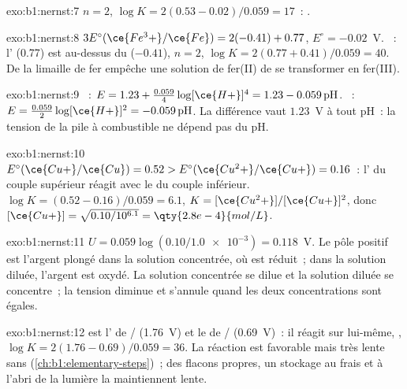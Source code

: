 \begin{solution}{exo:b1:nernst:7}
$n = 2$, $\log K = 2(0.53 - 0.02)/0.059 = 17$~: .
\end{solution}

\begin{solution}{exo:b1:nernst:8}
$3E^\circ(\ce{Fe^3+}/\ce{Fe}) = 2(-0.41) + 0.77$, $E^\circ = -0.02$~V.
~: l'  (0.77) est au-dessus du
  ($-0.41$), $n = 2$,
$\log K = 2(0.77 + 0.41)/0.059 = 40$. De la limaille de fer empêche une
solution de fer(II) de se transformer en fer(III).
\end{solution}

\begin{solution}{exo:b1:nernst:9}
~: $E = 1.23 + \frac{0.059}{4}\log [\ce{H+}]^4 =
1.23 - 0.059\,\mathrm{pH}$. ~: $E = \frac{0.059}{2}\log
[\ce{H+}]^2 = -0.059\,\mathrm{pH}$. La différence vaut $1.23$~V à tout
pH~: la tension de la pile à combustible ne dépend pas du pH.
\end{solution}

\begin{solution}{exo:b1:nernst:10}
$E^\circ(\ce{Cu+}/\ce{Cu}) = 0.52 > E^\circ(\ce{Cu^2+}/\ce{Cu+}) = 0.16$~:
l'  du couple supérieur réagit avec le  
du couple inférieur. $\log K = (0.52 - 0.16)/0.059 = 6.1$, $K =
[\ce{Cu^2+}]/[\ce{Cu+}]^2$, donc $[\ce{Cu+}] = \sqrt{0.10/10^{6.1}} =
\qty{2.8e-4}{mol/L}$.
\end{solution}

\begin{solution}{exo:b1:nernst:11}
$U = 0.059\log(0.10/\num{1.0e-3}) = 0.118$~V. Le pôle positif est
l'argent plongé dans la solution concentrée, où  est réduit~;
dans la solution diluée, l'argent est oxydé. La solution concentrée se
dilue et la solution diluée se concentre~; la tension diminue et
s'annule quand les deux concentrations sont égales.
\end{solution}

\begin{solution}{exo:b1:nernst:12}
 est l' de / (1.76~V) et le 
de / (0.69~V)~: il réagit sur lui-même,
,
$\log K = 2(1.76 - 0.69)/0.059 = 36$. La réaction est favorable mais
très lente sans  (\cref{ch:b1:elementary-steps})~; des flacons
propres, un stockage au frais et à l'abri de la lumière la maintiennent
lente.
\end{solution}

